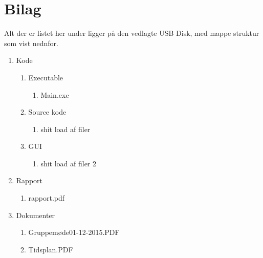 \appendix
\section{Bilag} \hfill
Alt der er listet her under ligger på den vedlagte USB Disk, med mappe struktur som vist nednfor.
\label{sec:bilag}
\begin{enumerate}[noitemsep]
	\item Kode
	\begin{enumerate}[noitemsep]
		\item Executable
		\begin{enumerate}[noitemsep]
			\item Main.exe
		\end{enumerate}
		\item Source kode
		\begin{enumerate}[noitemsep]
			\item shit load af filer
		\end{enumerate}
		\item GUI
		\begin{enumerate}[noitemsep]
			\item shit load af filer 2
		\end{enumerate}
	\end{enumerate}
	\item Rapport
	\begin{enumerate}[noitemsep]
		\item rapport.pdf
	\end{enumerate}
	\item Dokumenter
	\begin{enumerate}[noitemsep]
		\item Gruppemøde01-12-2015.PDF \label{itm:Modereferat1}
		\item Tidsplan.PDF \label{itm:Tidsplan1}
	\end{enumerate}
\end{enumerate}